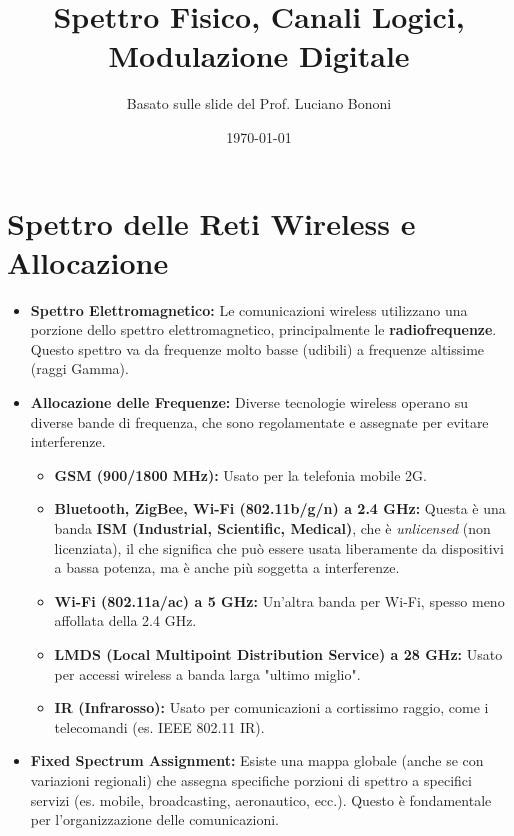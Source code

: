 

\title{Spettro Fisico, Canali Logici, Modulazione Digitale}
\author{Basato sulle slide del Prof. Luciano Bononi}
\date{\today}

\usetikzlibrary{decorations.pathmorphing}



\maketitle
\tableofcontents
\newpage

\section{Spettro delle Reti Wireless e Allocazione}

\begin{itemize}
    \item \textbf{Spettro Elettromagnetico:} Le comunicazioni wireless utilizzano una porzione dello spettro elettromagnetico, principalmente le \textbf{radiofrequenze}. Questo spettro va da frequenze molto basse (udibili) a frequenze altissime (raggi Gamma).
    \item \textbf{Allocazione delle Frequenze:} Diverse tecnologie wireless operano su diverse bande di frequenza, che sono regolamentate e assegnate per evitare interferenze.
    \begin{itemize}
        \item \textbf{GSM (900/1800 MHz):} Usato per la telefonia mobile 2G.
        \item \textbf{Bluetooth, ZigBee, Wi-Fi (802.11b/g/n) a 2.4 GHz:} Questa è una banda \textbf{ISM (Industrial, Scientific, Medical)}, che è \textit{unlicensed} (non licenziata), il che significa che può essere usata liberamente da dispositivi a bassa potenza, ma è anche più soggetta a interferenze.
        \item \textbf{Wi-Fi (802.11a/ac) a 5 GHz:} Un'altra banda per Wi-Fi, spesso meno affollata della 2.4 GHz.
        \item \textbf{LMDS (Local Multipoint Distribution Service) a 28 GHz:} Usato per accessi wireless a banda larga "ultimo miglio".
        \item \textbf{IR (Infrarosso):} Usato per comunicazioni a cortissimo raggio, come i telecomandi (es. IEEE 802.11 IR).
    \end{itemize}
    \item \textbf{Fixed Spectrum Assignment:} Esiste una mappa globale (anche se con variazioni regionali) che assegna specifiche porzioni di spettro a specifici servizi (es. mobile, broadcasting, aeronautico, ecc.). Questo è fondamentale per l'organizzazione delle comunicazioni.
\end{itemize}
